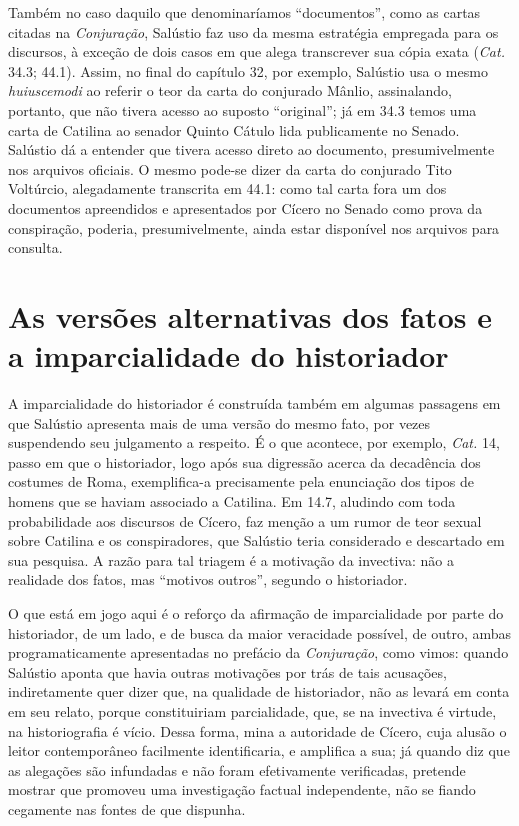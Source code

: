  Também no caso daquilo que denominaríamos  “documentos”, como as cartas
 citadas na \emph{Conjuração}, Salústio faz uso da mesma estratégia empregada
 para os discursos, à exceção de dois casos em que alega transcrever
 sua cópia exata (\emph{Cat.} 34.3; 44.1). Assim, no final do capítulo 32, por exemplo, Salústio usa o mesmo 
\emph{huiuscemodi} ao referir o teor da carta do conjurado Mânlio, assinalando, portanto, que não tivera acesso ao suposto ``original''; já em 34.3 temos uma carta de Catilina ao senador Quinto Cátulo lida publicamente no Senado. Salústio dá a entender que tivera acesso direto ao documento, presumivelmente nos arquivos oficiais. O mesmo pode-se dizer da carta do conjurado Tito Voltúrcio, alegadamente transcrita em 44.1: como tal carta fora um dos documentos apreendidos e apresentados por Cícero no Senado como prova da conspiração, poderia, presumivelmente, ainda estar disponível nos arquivos para consulta. 

 

\section{As versões alternativas dos fatos e  a imparcialidade do historiador}

 A imparcialidade do historiador é construída também em algumas passagens em
 que Salústio apresenta mais de uma versão do mesmo fato, por vezes suspendendo
 seu julgamento a respeito. É o que acontece, por exemplo, \emph{Cat.} 14, passo em
 que o historiador, logo após sua digressão acerca da decadência dos costumes
 de Roma, exemplifica-a precisamente pela enunciação dos tipos de homens que se
 haviam associado a Catilina. Em 14.7, aludindo com toda probabilidade aos discursos de 
 Cícero, faz menção a um rumor de teor sexual sobre Catilina e os conspiradores, que Salústio teria considerado e
 descartado em sua pesquisa. A razão para tal triagem é a motivação da invectiva: não a realidade dos fatos, mas ``motivos outros'', segundo o historiador. 
 
 O que está em jogo aqui é o reforço da afirmação de
 imparcialidade por parte do historiador, de um lado, e de busca da maior
 veracidade possível, de outro, ambas programaticamente apresentadas no
 prefácio da \emph{Conjuração}, como vimos: quando Salústio aponta que havia
 outras motivações por trás de tais acusações, indiretamente quer dizer que, na
 qualidade de historiador, não as levará em conta em seu relato, porque
 constituiriam parcialidade, que, se na invectiva é virtude, na historiografia
 é vício. 
 Dessa forma, mina a autoridade
 de Cícero, cuja alusão o leitor contemporâneo facilmente identificaria, e
 amplifica a sua; já quando diz que as alegações são infundadas e não foram
 efetivamente verificadas, pretende mostrar que promoveu uma investigação
 factual independente, não se fiando cegamente nas fontes de que dispunha.
 
